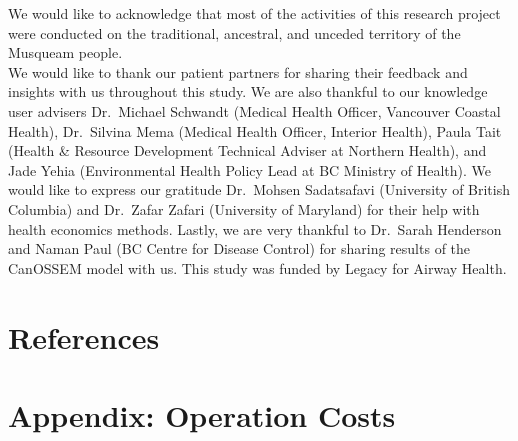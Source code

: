 \documentclass[
  number]{elsarticle}
\begin{document}
We would like to acknowledge that most of the activities of this
research project were conducted on the traditional, ancestral, and
unceded territory of the Musqueam people.\\
We would like to thank our patient partners for sharing their feedback
and insights with us throughout this study. We are also thankful to our
knowledge user advisers Dr.~Michael Schwandt (Medical Health Officer,
Vancouver Coastal Health), Dr.~Silvina Mema (Medical Health Officer,
Interior Health), Paula Tait (Health \& Resource Development Technical
Adviser at Northern Health), and Jade Yehia (Environmental Health Policy
Lead at BC Ministry of Health). We would like to express our gratitude
Dr.~Mohsen Sadatsafavi (University of British Columbia) and Dr.~Zafar
Zafari (University of Maryland) for their help with health economics
methods. Lastly, we are very thankful to Dr.~Sarah Henderson and Naman
Paul (BC Centre for Disease Control) for sharing results of the CanOSSEM
model with us. This study was funded by Legacy for Airway Health.

\hypertarget{references}{%
\section{References}\label{references}}

\renewcommand{\bibsection}{}


\hypertarget{appendix-operation-costs}{%
\section{Appendix: Operation Costs}\label{appendix-operation-costs}}
\end{document}
